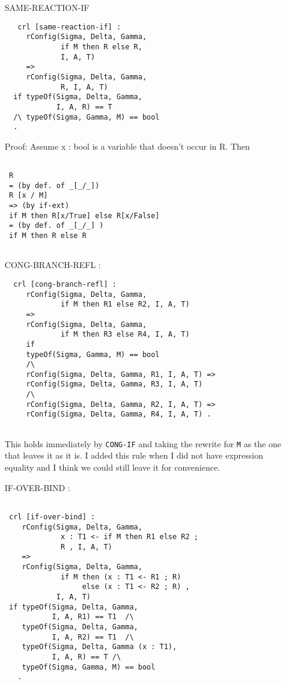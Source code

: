 \documentclass{article}
\begin{document}
\begin{itemize}

\item[SAME-REACTION-IF]
\begin{lstlisting}
   crl [same-reaction-if] : 
     rConfig(Sigma, Delta, Gamma, 
             if M then R else R, 
             I, A, T)
     => 
     rConfig(Sigma, Delta, Gamma, 
             R, I, A, T) 
  if typeOf(Sigma, Delta, Gamma, 
            I, A, R) == T  
  /\ typeOf(Sigma, Gamma, M) == bool 
  . 
   \end{lstlisting} 
   
Proof:
Assume x : bool is a variable that doesn't occur in R. Then
\begin{lstlisting}
 
 R 
 = (by def. of _[_/_]) 
 R [x / M] 
 => (by if-ext)
 if M then R[x/True] else R[x/False]
 = (by def. of _[_/_] )
 if M then R else R 
 
\end{lstlisting}   
   
\item[CONG-BRANCH-REFL]:
\begin{lstlisting}  
  crl [cong-branch-refl] : 
     rConfig(Sigma, Delta, Gamma, 
             if M then R1 else R2, I, A, T)
     => 
     rConfig(Sigma, Delta, Gamma, 
             if M then R3 else R4, I, A, T)
     if
     typeOf(Sigma, Gamma, M) == bool 
     /\
     rConfig(Sigma, Delta, Gamma, R1, I, A, T) => 
     rConfig(Sigma, Delta, Gamma, R3, I, A, T)
     /\
     rConfig(Sigma, Delta, Gamma, R2, I, A, T) => 
     rConfig(Sigma, Delta, Gamma, R4, I, A, T) . 
  
    \end{lstlisting}
    This holds immediately by \texttt{CONG-IF} and taking the 
    rewrite for \texttt{M} as the one that leaves it as it is.
    I added this rule when I did not have expression equality
    and I think we could still leave it for convenience.

\item[IF-OVER-BIND]:
\begin{lstlisting}  
 
 crl [if-over-bind] : 
    rConfig(Sigma, Delta, Gamma, 
             x : T1 <- if M then R1 else R2 ; 
             R , I, A, T) 
    =>
    rConfig(Sigma, Delta, Gamma, 
             if M then (x : T1 <- R1 ; R) 
                  else (x : T1 <- R2 ; R) , 
            I, A, T) 
 if typeOf(Sigma, Delta, Gamma, 
           I, A, R1) == T1  /\
    typeOf(Sigma, Delta, Gamma, 
           I, A, R2) == T1  /\
    typeOf(Sigma, Delta, Gamma (x : T1), 
           I, A, R) == T /\
    typeOf(Sigma, Gamma, M) == bool
   .
   

\end{lstlisting}
\end{itemize}
\end{document}
